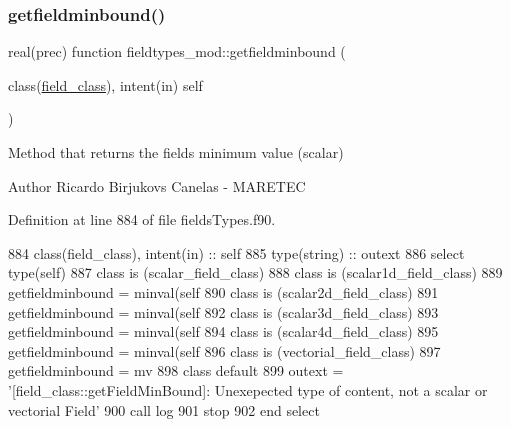 \subsubsection{\texorpdfstring{getfieldminbound()}{getfieldminbound()}}
{\footnotesize\ttfamily real(prec) function fieldtypes\+\_\+mod\+::getfieldminbound (\begin{DoxyParamCaption}\item[{class(\mbox{\hyperlink{structfieldtypes__mod_1_1field__class}{field\+\_\+class}}), intent(in)}]{self }\end{DoxyParamCaption})\hspace{0.3cm}{\ttfamily [private]}}



Method that returns the field\textquotesingle{}s minimum value (scalar) 

\begin{DoxyAuthor}{Author}
Ricardo Birjukovs Canelas -\/ M\+A\+R\+E\+T\+EC 
\end{DoxyAuthor}


Definition at line 884 of file fields\+Types.\+f90.


\begin{DoxyCode}
884     \textcolor{keywordtype}{class}(field\_class), \textcolor{keywordtype}{intent(in)} :: self
885     \textcolor{keywordtype}{type}(string) :: outext
886     \textcolor{keywordflow}{select type}(self)
887 \textcolor{keywordflow}{    class is} (scalar\_field\_class)
888 \textcolor{keywordflow}{    class is} (scalar1d\_field\_class)
889         getfieldminbound = minval(self%
890 \textcolor{keywordflow}{    class is} (scalar2d\_field\_class)
891         getfieldminbound = minval(self%
892 \textcolor{keywordflow}{    class is} (scalar3d\_field\_class)
893         getfieldminbound = minval(self%
894 \textcolor{keywordflow}{    class is} (scalar4d\_field\_class)
895         getfieldminbound = minval(self%
896 \textcolor{keywordflow}{    class is} (vectorial\_field\_class)
897         getfieldminbound = mv
898 \textcolor{keywordflow}{        class default}
899         outext = \textcolor{stringliteral}{'[field\_class::getFieldMinBound]: Unexepected type of content, not a scalar or vectorial
       Field'}
900         \textcolor{keyword}{call }log%
901         stop
902 \textcolor{keywordflow}{    end select}
\end{DoxyCode}
\mbox{\label{namespacefieldtypes__mod_afad53b4aed8733a243672c2dc19f62f3}} 
